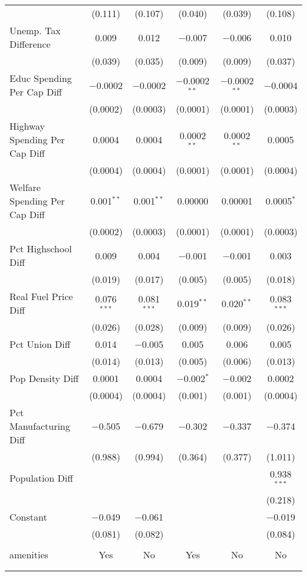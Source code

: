 \begin{table}[!htbp]
\begin{tabular}{@{\extracolsep{5pt}}lccccc}
  & (0.111) & (0.107) & (0.040) & (0.039) & (0.108) \\ 
  Unemp. Tax Difference & 0.009 & 0.012 & $-$0.007 & $-$0.006 & 0.010 \\ 
  & (0.039) & (0.035) & (0.009) & (0.009) & (0.037) \\ 
  Educ Spending Per Cap Diff & $-$0.0002 & $-$0.0002 & $-$0.0002$^{**}$ & $-$0.0002$^{**}$ & $-$0.0004 \\ 
  & (0.0002) & (0.0003) & (0.0001) & (0.0001) & (0.0003) \\ 
  Highway Spending Per Cap Diff & 0.0004 & 0.0004 & 0.0002$^{**}$ & 0.0002$^{**}$ & 0.0005 \\ 
  & (0.0004) & (0.0004) & (0.0001) & (0.0001) & (0.0004) \\ 
  Welfare Spending Per Cap Diff & 0.001$^{**}$ & 0.001$^{**}$ & 0.00000 & 0.00001 & 0.0005$^{*}$ \\ 
  & (0.0002) & (0.0003) & (0.0001) & (0.0001) & (0.0003) \\ 
  Pct Highschool Diff & 0.009 & 0.004 & $-$0.001 & $-$0.001 & 0.003 \\ 
  & (0.019) & (0.017) & (0.005) & (0.005) & (0.018) \\ 
  Real Fuel Price Diff & 0.076$^{***}$ & 0.081$^{***}$ & 0.019$^{**}$ & 0.020$^{**}$ & 0.083$^{***}$ \\ 
  & (0.026) & (0.028) & (0.009) & (0.009) & (0.026) \\ 
  Pct Union Diff & 0.014 & $-$0.005 & 0.005 & 0.006 & 0.005 \\ 
  & (0.014) & (0.013) & (0.005) & (0.006) & (0.013) \\ 
  Pop Density Diff & 0.0001 & 0.0004 & $-$0.002$^{*}$ & $-$0.002 & 0.0002 \\ 
  & (0.0004) & (0.0004) & (0.001) & (0.001) & (0.0004) \\ 
  Pct Manufacturing Diff & $-$0.505 & $-$0.679 & $-$0.302 & $-$0.337 & $-$0.374 \\ 
  & (0.988) & (0.994) & (0.364) & (0.377) & (1.011) \\ 
  Population Diff &  &  &  &  & 0.938$^{***}$ \\ 
  &  &  &  &  & (0.218) \\ 
  Constant & $-$0.049 & $-$0.061 &  &  & $-$0.019 \\ 
  & (0.081) & (0.082) &  &  & (0.084) \\ 
 \hline \\[-1.8ex] 
amenities & Yes & No & Yes & No & No \\ 
\hline \\[-1.8ex] 
\hline 
\hline \\[-1.8ex] 
\end{tabular} 
\end{table} 
